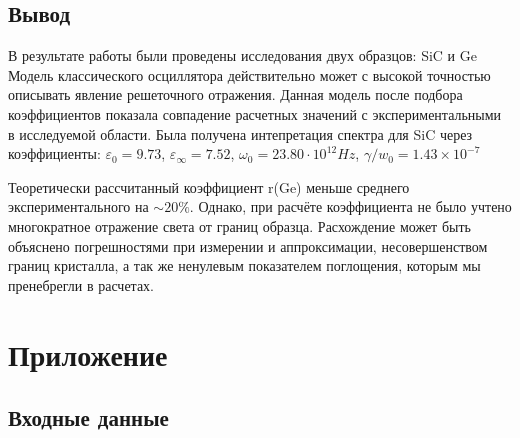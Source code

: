 \documentclass[a4paper,11pt]{report}\usepackage[]{graphicx}\usepackage[]{color}
\begin{document}
\clearpage
\section*{Вывод}

В результате работы были проведены исследования двух образцов: SiC и Ge
Модель классического осциллятора действительно может с высокой точностью описывать явление решеточного отражения. Данная модель после подбора коэффициентов показала  совпадение расчетных значений с экспериментальными в исследуемой области. Была получена интепретация спектра для SiC через коэффициенты: $\varepsilon_0 = 9.73$, $\varepsilon_{\infty} =   7.52$, $\omega_0 = 23.80 \cdot 10^{12} Hz$, $\gamma/w_0 = \ensuremath{1.43\times 10^{-7}} $

Теоретически рассчитанный коэффициент r(Ge) меньше среднего экспериментального на $\sim 20\%$. Однако, при расчёте коэффициента не было учтено многократное отражение света от границ образца. Расхождение может быть объяснено погрешностями при измерении и аппроксимации, несовершенством границ кристалла, а так же ненулевым показателем поглощения, которым мы пренебрегли в расчетах. 


\chapter*{Приложение} \label{Appendix}
\section*{Входные данные}
\end{document}
